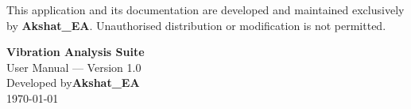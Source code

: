 \documentclass[12pt, a4paper]{article}
\begin{document}
\vspace{0.5cm}

\begin{notebox}
This application and its documentation are developed and maintained
exclusively by \textbf{Akshat\_EA}.  Unauthorised distribution or
modification is not permitted.
\end{notebox}

\newpage
\pagecolor{headerbg}
\color{headertext}
\vspace*{\fill}
\begin{center}
  {\Large\bfseries Vibration Analysis Suite}\\[0.4cm]
  {\color{muted} User Manual — Version 1.0}\\[1.5cm]
  {\color{muted}\small Developed by\;}\textbf{\color{accent}\large Akshat\_EA}\\[0.4cm]
  {\color{muted}\small \today}
\end{center}
\vspace*{\fill}
\end{document}
